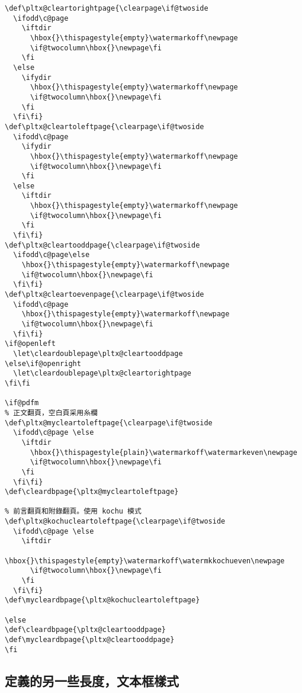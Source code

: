 \begin{lstlisting}[firstnumber=330]
\def\pltx@cleartorightpage{\clearpage\if@twoside
  \ifodd\c@page
    \iftdir
      \hbox{}\thispagestyle{empty}\watermarkoff\newpage
      \if@twocolumn\hbox{}\newpage\fi
    \fi
  \else
    \ifydir
      \hbox{}\thispagestyle{empty}\watermarkoff\newpage
      \if@twocolumn\hbox{}\newpage\fi
    \fi
  \fi\fi}
\def\pltx@cleartoleftpage{\clearpage\if@twoside
  \ifodd\c@page
    \ifydir
      \hbox{}\thispagestyle{empty}\watermarkoff\newpage
      \if@twocolumn\hbox{}\newpage\fi
    \fi
  \else
    \iftdir
      \hbox{}\thispagestyle{empty}\watermarkoff\newpage
      \if@twocolumn\hbox{}\newpage\fi
    \fi
  \fi\fi}
\def\pltx@cleartooddpage{\clearpage\if@twoside
  \ifodd\c@page\else
    \hbox{}\thispagestyle{empty}\watermarkoff\newpage
    \if@twocolumn\hbox{}\newpage\fi
  \fi\fi}
\def\pltx@cleartoevenpage{\clearpage\if@twoside
  \ifodd\c@page
    \hbox{}\thispagestyle{empty}\watermarkoff\newpage
    \if@twocolumn\hbox{}\newpage\fi
  \fi\fi}
\if@openleft
  \let\cleardoublepage\pltx@cleartooddpage
\else\if@openright
  \let\cleardoublepage\pltx@cleartorightpage
\fi\fi

\if@pdfm
% 正文翻頁，空白頁采用糸欄
\def\pltx@mycleartoleftpage{\clearpage\if@twoside
  \ifodd\c@page \else
    \iftdir
      \hbox{}\thispagestyle{plain}\watermarkoff\watermarkeven\newpage
      \if@twocolumn\hbox{}\newpage\fi
    \fi
  \fi\fi}
\def\cleardbpage{\pltx@mycleartoleftpage}

% 前言翻頁和附錄翻頁。使用 kochu 模式
\def\pltx@kochucleartoleftpage{\clearpage\if@twoside
  \ifodd\c@page \else
    \iftdir
      \hbox{}\thispagestyle{empty}\watermarkoff\watermkkochueven\newpage
      \if@twocolumn\hbox{}\newpage\fi
    \fi
  \fi\fi}
\def\mycleardbpage{\pltx@kochucleartoleftpage}

\else
\def\cleardbpage{\pltx@cleartooddpage}
\def\mycleardbpage{\pltx@cleartooddpage}
\fi
\end{lstlisting}

\subsection{定義的另一些長度，文本框樣式}

